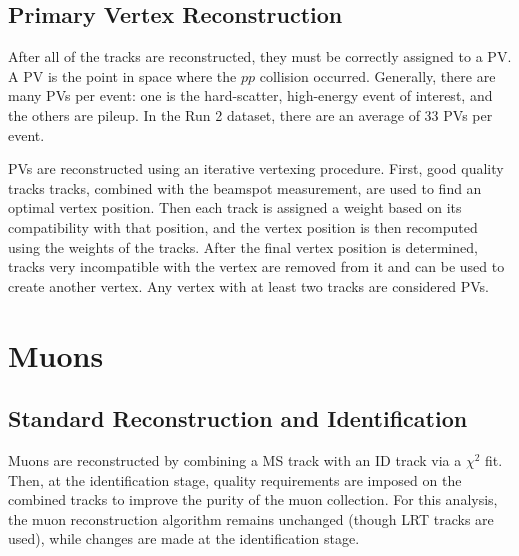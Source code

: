 



\subsection{Primary Vertex Reconstruction}

After all of the tracks are reconstructed, they must be correctly assigned to a \ac{PV}. A \ac{PV} is the point in space where the $pp$ collision occurred. Generally, there are many \acp{PV} per event: one is the hard-scatter, high-energy event of interest, and the others are pileup. In the Run 2 dataset, there are an average of 33 \ac{PV}s per event.

\acp{PV} are reconstructed using an iterative vertexing procedure. First, good quality tracks tracks, combined with the beamspot measurement, are used to find an optimal vertex position. Then each track is assigned a weight based on its compatibility with that position, and the vertex position is then recomputed using the weights of the tracks. After the final vertex position is determined, tracks very incompatible with the vertex are removed from it and can be used to create another vertex. Any vertex with at least two tracks are considered \acp{PV}.




\section{Muons}
\label{sec:muonreco}
\subsection{Standard Reconstruction and Identification}

Muons are reconstructed by combining a \ac{MS} track with an \ac{ID} track via a $\chi^2$ fit. Then, at the identification stage, quality requirements are imposed on the combined tracks to improve the purity of the muon collection. For this analysis, the muon reconstruction algorithm remains unchanged (though \ac{LRT} tracks are used), while changes are made at the identification stage. \cite{muon-reco}

